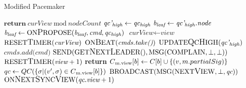 \begin{algorithm}[h!]
	\caption{Modified Pacemaker}\label{pacemaker}
	\begin{algorithmic}[1]
		\color{Green}
		\State $\textbf{return}\ \textit{curView}\ \text{mod}\ \textit{nodeCount}$
		\color{black}
	\EndFunction
			\State $ \textit{qc'\textsubscript{high}} \gets \textit{qc\textsubscript{high}} $
			\State $ \textit{b\textsubscript{leaf}} \gets \textit{qc'\textsubscript{high}.node}$
		\EndIf
	\EndProcedure
			\State $ \textit{b\textsubscript{leaf}} \gets \text{ON{\large P}ROPOSE}(\textit{b\textsubscript{leaf}}, \textit{cmd}, \textit{qc\textsubscript{high}})$
		\EndIf
	\EndProcedure
		\color{Magenta}
		\State $ \textit{curView} \gets \textit{view}$
		\State $ \text{RESET{\large T}IMER}(\textit{curView})$
		\State $ \text{ON{\large B}EAT}(\textit{cmds.take()})$
		\color{black}
	\EndProcedure
		\State $ \text{UPDATE{\large Q}C{\large H}IGH}(\textit{qc'\textsubscript{high}}) $
	\EndProcedure
	\color{Green}
		\State $ \textit{cmds.add(cmd)} $
	\EndProcedure
		\State $ \text{SEND}(\text{GET{\large N}EXT{\large L}EADER}(), \text{MSG}(\text{COMPLAIN}, \bot, \bot)) $
		\State $ \text{RESET{\large T}IMER}(\textit{view} + 1) $
	\EndProcedure
				\State \textbf{return}
			\EndIf
			\State $C\textsubscript{m.view}[b] \gets C[b] \cup \{(v, m.partialSig)\}$
				\State $qc \gets QC(\{ \sigma | (v', \sigma) \in C\textsubscript{m.view}[b]\})$
				\State $\text{BROADCAST}(\text{MSG}(\text{NEXT{\large V}IEW}, \bot, \textit{qc}))$
			\EndIf
		\EndIf
	\EndProcedure
				\State $\text{ON{\large N}EXT{\large S}YNC{\large V}IEW}(\textit{qc.view} + 1)$
		\EndIf
	\EndProcedure
	\end{algorithmic}
\end{algorithm}

